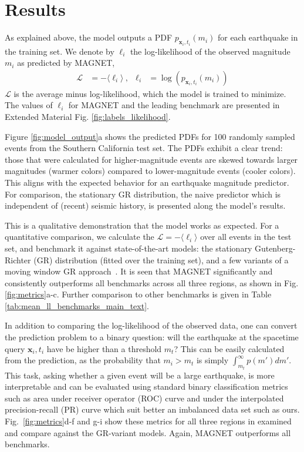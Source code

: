 \documentclass[pdflatex]{sn-jnl}
\begin{document}
\section{Results} \label{sec:results}
As explained above, the model outputs a PDF $p_{\textbf{x}_i, t_i}(m_i)$ for each earthquake in the training set. We denote by $\ell_i$ the log-likelihood of the observed magnitude $m_i$ as predicted by MAGNET, 
\begin{align}
    \mathcal{L} &= -\langle \ell_i \rangle\ , 
    &
    \ell_i&=\log\left(p_{\textbf{x}_i, t_i}(m_i)\right)
    \label{eq:likelihood}
\end{align}
 $\mathcal{L}$ is the average minus log-likelihood, which the model is trained to minimize.  The values of $\ell_i$ for MAGNET and the leading benchmark are presented in Extended Material Fig. \ref{fig:labels_likelihood}.
 

Figure \ref{fig:model_output}a shows the predicted PDFs for 100 randomly sampled events from the Southern California test set. The PDFs exhibit a clear trend: those that were calculated for higher-magnitude events are skewed towards larger magnitudes (warmer colors) compared to lower-magnitude events (cooler colors). This aligns with the expected behavior for an earthquake magnitude predictor. For comparison, the stationary GR distribution, the naive predictor which is independent of (recent) seismic history, is presented along the model's results.

This is a qualitative demonstration that the model works as expected. For a quantitative comparison, we calculate the $\mathcal{L}=-\langle \ell_i \rangle$ over all events in the test set, and benchmark it against state-of-the-art models:
the stationary Gutenberg-Richter (GR) distribution (fitted over the training set), and a few variants of a moving window GR approach~\cite{gulia_real-time_2019}. It is seen that MAGNET significantly and consistently outperforms all benchmarks across all three regions, as shown in Fig. \ref{fig:metrics}a-c. Further comparison to other benchmarks is given in Table \ref{tab:mean_ll_benchmarks_main_text}.

In addition to comparing the log-likelihood of the observed data, one can convert the prediction problem to a binary question: will the earthquake at the spacetime query $\textbf{x}_i, t_i$ have be higher than a threshold $m_t$? This can be easily calculated from the prediction, as the probability that $m_i>m_t$ is simply $\int_{m_t}^{\infty}p(m')dm'$.
This task, asking whether a given event will be a large earthquake, is more interpretable and can be evaluated using standard binary classification metrics such as area under receiver operator (ROC) curve \cite{Murphy} and under the interpolated precision-recall (PR) curve \cite{buttcher_information_2010} which suit better an imbalanced data set such as ours. Fig.~\ref{fig:metrics}d-f and g-i show these metrics for all three regions in examined and compare against the GR-variant models. Again, MAGNET outperforms all benchmarks.
\end{document}
